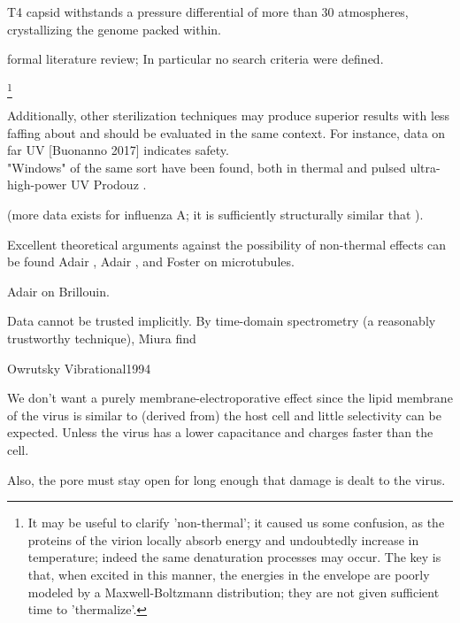 \documentclass[paper.tex]{subfiles}
\begin{document}
\begin{multicols}{1}

T4 capsid withstands a pressure differential of more than 30 atmospheres, crystallizing the genome packed within. \cite{Osmotic2003}


formal literature review; In particular no search criteria were defined.

%
\footnote{It may be useful to clarify 'non-thermal'; it caused us some confusion, as the proteins of the virion locally absorb energy and undoubtedly increase in temperature; indeed the same denaturation processes may occur. The key is that, when excited in this manner, the energies in the envelope are poorly modeled by a Maxwell-Boltzmann distribution; they are not given sufficient time to 'thermalize'.} 
%

Additionally, other sterilization techniques may produce superior results with less faffing about and should be evaluated in the same context. For instance, data on far UV [Buonanno 2017] indicates safety.\\



"Windows" of the same sort have been found, both in thermal and pulsed ultra-high-power UV Prodouz \cite{Use1987a}.


(more data exists for influenza A; it is sufficiently structurally similar that ).



Excellent theoretical arguments against the possibility of non-thermal effects can be found Adair \cite{Vibrational2002}, Adair \cite{Biological2002}, and Foster \cite{Viscous2000} on microtubules. 



Adair \cite{Biophysics2000} on Brillouin.


Data cannot be trusted implicitly. By time-domain spectrometry (a reasonably trustworthy technique), Miura \cite{Microwave1994} find 


Owrutsky Vibrational1994




We don't want a purely membrane-electroporative effect since the lipid membrane of the virus is similar to (derived from) the host cell and little selectivity can be expected. Unless the virus has a lower capacitance and charges faster than the cell.

Also, the pore must stay open for long enough that damage is dealt to the virus. 




\end{multicols}
\end{document}
